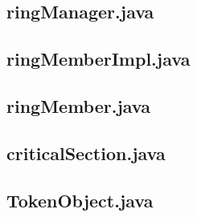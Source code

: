\documentclass[11pt, a4paper]{article}
\begin{document}
\subsection{ringManager.java}

\newpage
\subsection{ringMemberImpl.java}

\newpage
\subsection{ringMember.java}

\newpage
\subsection{criticalSection.java}

\newpage
\subsection{TokenObject.java}

\end{document}
